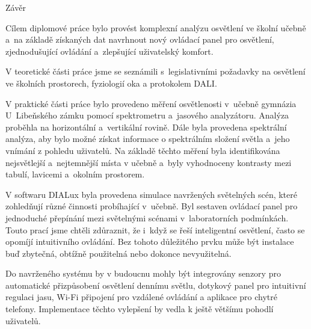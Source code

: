 \nonum\chap Závěr

Cílem diplomové práce bylo provést komplexní analýzu osvětlení ve školní učebně a~na základě získaných dat
navrhnout nový ovládací panel pro osvětlení, zjednodušující ovládání a~zlepšující uživatelský komfort.

V teoretické části práce jsme se seznámili s~legislativními požadavky na osvětlení ve školních prostorech,
fyziologií oka a protokolem DALI.

V praktické části práce bylo provedeno měření osvětlenosti v~učebně gymnázia U~Libeňského zámku pomocí spektrometru
a~jasového analyzátoru. Analýza proběhla na horizontální a~vertikální rovině. Dále byla provedena spektrální analýza,
aby bylo možné získat informace o spektrálním složení světla a~jeho vnímání z pohledu uživatelů. Na základě těchto měření
byla identifikována nejsvětlejší a~nejtemnější místa v učebně a~byly vyhodnoceny kontrasty mezi tabulí, lavicemi
a~okolním prostorem.

V softwaru DIALux byla provedena simulace navržených světelných scén, které zohledňují různé činnosti probíhající v~učebně.
Byl sestaven ovládací panel pro jednoduché přepínání mezi světelnými scénami v~laboratorních podmínkách.
Touto prací jsme chtěli zdůraznit, že i~když se řeší inteligentní osvětlení, často se opomíjí
intuitivního ovládání. Bez tohoto důležitého prvku může být instalace buď zbytečná, obtížně použitelná nebo dokonce nevyužitelná.

Do navrženého systému by v budoucnu mohly být integrovány senzory pro automatické přizpůsobení osvětlení dennímu světlu,
dotykový panel pro intuitivní regulaci jasu, Wi-Fi připojení pro vzdálené ovládání a aplikace pro chytré telefony.
Implementace těchto vylepšení by vedla k ještě většímu pohodlí uživatelů.
















